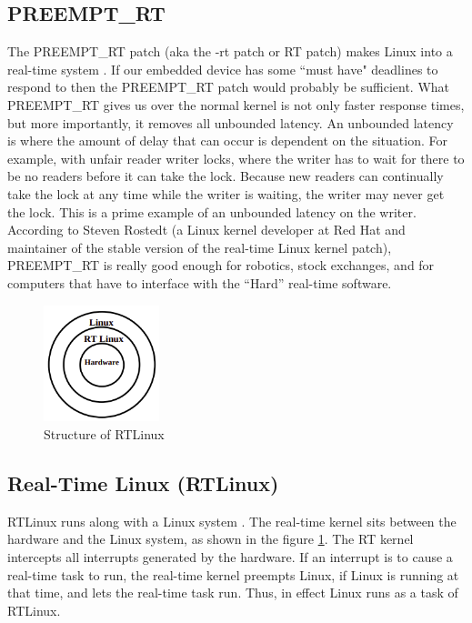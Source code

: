 \documentclass[12pt]{report}
\begin{document}
\subsection{PREEMPT\_RT}
The PREEMPT\_RT patch (aka the -rt patch or RT patch) makes Linux into a real-time system \cite{rtlinux}. If our embedded device has some ``must have" deadlines to respond to then the PREEMPT\_RT patch would probably be sufficient. What PREEMPT\_RT gives us over the normal kernel is not only faster response times, but more importantly, it removes all unbounded latency. An unbounded latency is where the amount of delay that can occur is dependent on the situation. For example, with unfair reader writer locks, where the writer has to wait for there to be no readers before it can take the lock. Because new readers can continually take the lock at any time while the writer is waiting, the writer may never get the lock. This is a prime example of an unbounded latency on the writer.\\

According to Steven Rostedt (a Linux kernel developer at Red Hat and maintainer of the stable version of the real-time Linux kernel patch), PREEMPT\_RT is really good enough for robotics, stock exchanges, and for computers that have to interface with the “Hard” real-time software.

\begin{figure}[h]
\centering
\includegraphics[width=0.3\textwidth]{images/rtlinux.png}
\caption{Structure of RTLinux}
\label{fig:rt-linux}
\end{figure}

\subsection{Real-Time Linux (RTLinux)}
RTLinux runs along with a Linux system \cite{embd-rtlinux}. The real-time kernel sits between the hardware and the Linux system, as shown in the figure \ref{fig:rt-linux}. The RT kernel intercepts all interrupts generated by the hardware. If an interrupt is to cause a real-time task to run, the real-time kernel preempts Linux, if Linux is running at that time, and lets the real-time task run. Thus, in effect Linux runs as a task of RTLinux. \\
\end{document}
